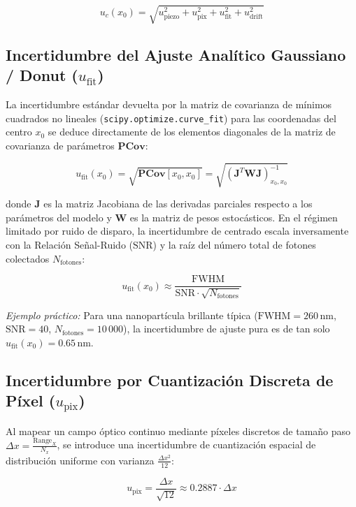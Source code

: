 \documentclass[11pt,a4paper]{article}
\begin{document}
\begin{equation}
    u_c(x_0) = \sqrt{u_{\text{piezo}}^2 + u_{\text{pix}}^2 + u_{\text{fit}}^2 + u_{\text{drift}}^2}
\end{equation}

\subsection{Incertidumbre del Ajuste Analítico Gaussiano / Donut ($u_{\text{fit}}$)}
La incertidumbre estándar devuelta por la matriz de covarianza de mínimos cuadrados no lineales (\texttt{scipy.optimize.curve_fit}) para las coordenadas del centro $x_0$ se deduce directamente de los elementos diagonales de la matriz de covarianza de parámetros $\mathbf{PCov}$:

\begin{equation}
    u_{\text{fit}}(x_0) = \sqrt{\mathbf{PCov}[x_0, x_0]} = \sqrt{\left( \mathbf{J}^T \mathbf{W} \mathbf{J} \right)^{-1}_{x_0, x_0}}
\end{equation}

donde $\mathbf{J}$ es la matriz Jacobiana de las derivadas parciales respecto a los parámetros del modelo y $\mathbf{W}$ es la matriz de pesos estocásticos. En el régimen limitado por ruido de disparo, la incertidumbre de centrado escala inversamente con la Relación Señal-Ruido ($\text{SNR}$) y la raíz del número total de fotones colectados $N_{\text{fotones}}$:

\begin{equation}
    u_{\text{fit}}(x_0) \approx \frac{\text{FWHM}}{\text{SNR} \cdot \sqrt{N_{\text{fotones}}}}
\end{equation}

\textit{Ejemplo práctico:} Para una nanopartícula brillante típica ($\text{FWHM} = 260\,\text{nm}$, $\text{SNR} = 40$, $N_{\text{fotones}} = 10\,000$), la incertidumbre de ajuste pura es de tan solo $u_{\text{fit}}(x_0) = 0.65\,\text{nm}$.

\subsection{Incertidumbre por Cuantización Discreta de Píxel ($u_{\text{pix}}$)}
Al mapear un campo óptico continuo mediante píxeles discretos de tamaño paso $\Delta x = \frac{\text{Range}_X}{N_x}$, se introduce una incertidumbre de cuantización espacial de distribución uniforme con varianza $\frac{\Delta x^2}{12}$:

\begin{equation}
    u_{\text{pix}} = \frac{\Delta x}{\sqrt{12}} \approx 0.2887 \cdot \Delta x
\end{equation}
\end{document}
